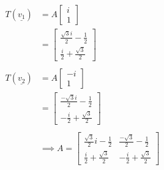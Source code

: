 \documentclass[11pt, a4paper, norsk]{NTNUoving}
\begin{document}
\begin{oppgave}
\begin{punkt}
            \begin{align*}
                T(\underline{v_1}) &= A\begin{bmatrix}
                    i \\
                    1
                \end{bmatrix}
                \\
                                   &= \begin{bmatrix}
                                       \frac{\sqrt{3}i}{2} - \frac{1}{2} \\
                                       \frac{i}{2} + \frac{\sqrt{3}}{2}
                                   \end{bmatrix}
                                   \\
                                   \\
                    T(\underline{v_2}) &= A\begin{bmatrix}
                        -i \\
                        1
                    \end{bmatrix}
                    \\
                                       &= \begin{bmatrix}
                                           \frac{-\sqrt{3}i}{2} - \frac{1}{2} \\
                                           -\frac{i}{2} + \frac{\sqrt{3}}{2}
                                       \end{bmatrix}
                                       \\
                                       \\
                                       &\implies A = \begin{bmatrix}
                                           \frac{\sqrt{3}}{2}i - \frac{1}{2} & \frac{-\sqrt{3}}{2} - \frac{1}{2} \\
                                           \frac{i}{2} + \frac{\sqrt{3}}{2} & -\frac{i}{2} + \frac{\sqrt{3}}{2}
                                       \end{bmatrix}
            \end{align*}
            
        \end{punkt}
    \end{oppgave}
\end{document}
